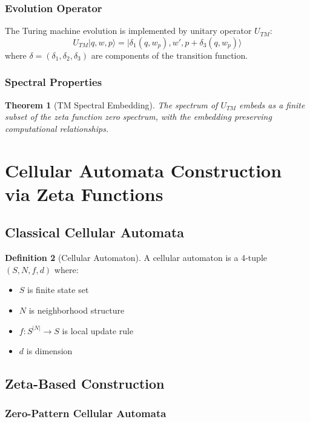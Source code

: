 \documentclass[12pt]{article}
\theoremstyle{plain}
\newtheorem{theorem}{Theorem}[section]
\theoremstyle{definition}
\newtheorem{definition}[theorem]{Definition}
\begin{document}
\subsubsection{Evolution Operator}

The Turing machine evolution is implemented by unitary operator $U_{TM}$:
$$U_{TM} |q, w, p\rangle = |\delta_1(q, w_p), w', p + \delta_3(q, w_p)\rangle$$
where $\delta = (\delta_1, \delta_2, \delta_3)$ are components of the transition function.

\subsubsection{Spectral Properties}

\begin{theorem}[TM Spectral Embedding]
The spectrum of $U_{TM}$ embeds as a finite subset of the zeta function zero spectrum, with the embedding preserving computational relationships.
\end{theorem}

\section{Cellular Automata Construction via Zeta Functions}

\subsection{Classical Cellular Automata}

\begin{definition}[Cellular Automaton]
A cellular automaton is a 4-tuple $(S, N, f, d)$ where:
\begin{itemize}
\item $S$ is finite state set
\item $N$ is neighborhood structure
\item $f: S^{|N|} \to S$ is local update rule
\item $d$ is dimension
\end{itemize}
\end{definition}

\subsection{Zeta-Based Construction}

\subsubsection{Zero-Pattern Cellular Automata}
\end{document}
